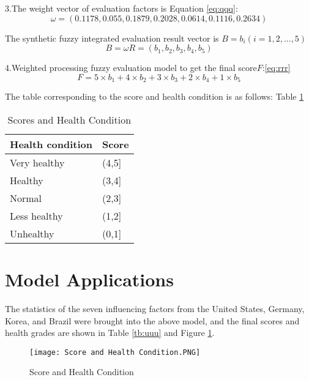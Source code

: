 \documentclass[12pt]{article}  %
\begin{document}
3.The weight vector of evaluation factors is Equation \eqref{eq:qqq}:
\begin{equation}\label{eq:qqq}
\omega=(0.1178,0.055,0.1879,0.2028,0.0614,0.1116,0.2634)
\end{equation}

The synthetic fuzzy integrated evaluation result vector is
$B=b_i(i=1,2,...,5)$
$$B=\omega R=(b_1,b_2,b_3,b_4,b_5)$$

4.Weighted processing fuzzy evaluation model to get the final score$F$:\ref{eq:rrr}
\begin{equation}\label{eq:rrr}
F=5\times b_1+4\times b_2+3\times b_3+2\times b_4+1\times b_5
\end{equation}

The table corresponding to the score and health condition is as follows:
Table \ref{tb:ttt}
\begin{table}[htp]
	\begin{center}
	\caption{Scores and Health Condition}
	\begin{tabular}{|l|l|}
		\hline
		Health condition & Score   \\ \hline
		Very healthy     & (4,5{]} \\ \hline
		Healthy          & (3,4{]} \\ \hline
		Normal           & (2,3{]} \\ \hline
		Less healthy     & (1,2{]} \\ \hline
		Unhealthy        & (0,1{]} \\ \hline
	\end{tabular}\label{tb:ttt}
		\end{center}
\end{table}

\section {Model Applications}

The statistics of the seven influencing factors from the United States, Germany, Korea, and Brazil were brought into the above model, and the final scores and health grades are shown in Table \ref{tb:uuu} and Figure \ref{fig:bbb}.

\begin{figure}[htp]
	\centering
	\texttt{[image: Score and Health Condition.PNG]}
	\caption{Score and Health Condition}\label{fig:bbb}
\end{figure}
\end{document}

